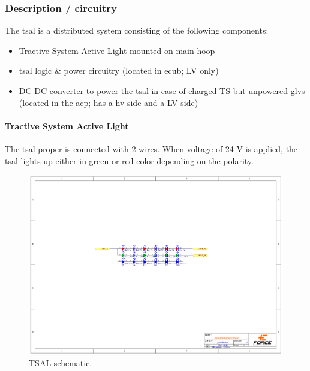 \subsubsection{Description / circuitry}

The \gls{tsal} is a distributed system consisting of the following components:
\begin{itemize}
\item Tractive System Active Light mounted on main hoop
\item \gls{tsal} logic \& power circuitry (located in \gls{ecub}; LV only)
\item DC-DC converter to power the \gls{tsal} in case of charged TS but unpowered \gls{glvs} (located in the \gls{acp}; has a \gls{hv} side and a LV side)
\end{itemize}

\paragraph{Tractive System Active Light}

The \gls{tsal} proper is connected with 2 wires. When voltage of 24 V is applied, the \gls{tsal} lights up either in green or red color depending on the polarity.

\begin{figure}[H]
	\centering
	\includegraphics[width=\textwidth,trim={6cm 10cm 6cm 7cm},clip]{./img/TSAL-schematic.pdf}
	\caption{TSAL schematic.}
	\label{fig:TSAL-schematic}
\end{figure}


